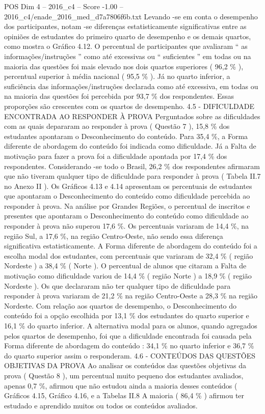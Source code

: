 \begin{textsample}{POS Dim 4 – 2016\_c4 – Score -1.00 – 2016\_c4/enade\_2016\_med\_d7a7806f6b.txt}
Levando -se em conta o desempenho dos participantes, notam -se diferenças estatisticamente significativas entre as opiniões de estudantes do primeiro quarto de desempenho e os demais quartos, como mostra o Gráfico 4.12.
O percentual de participantes que avaliaram “ as informações/instruções ” como até excessivas ou “ suficientes ” em todas ou na maioria das questões foi mais elevado nos dois quartos superiores ( 96,2 \% ), percentual superior à média nacional ( 95,5 \% ).
Já no quarto inferior, a suficiência das informações/instruções declarada como até excessiva, em todas ou na maioria das questões foi percebida por 93,7 \% dos respondentes.
Essas proporções são crescentes com os quartos de desempenho. 4.5 - DIFICULDADE ENCONTRADA AO RESPONDER À PROVA Perguntados sobre as dificuldades com as quais depararam ao responder à prova ( Questão 7 ), 15,8 \% dos estudantes apontaram o Desconhecimento do conteúdo.
Para 35,4 \%, a Forma diferente de abordagem do conteúdo foi indicada como dificuldade.
Já a Falta de motivação para fazer a prova foi a dificuldade apontada por 17,4 \% dos respondentes.
Considerando -se todo o Brasil, 26,2 \% dos respondentes afirmaram que não tiveram qualquer tipo de dificuldade para responder à prova ( Tabela II.7 no Anexo II ).
Os Gráficos 4.13 e 4.14 apresentam os percentuais de estudantes que apontaram o Desconhecimento do conteúdo como dificuldade percebida ao responder à prova.
Na análise por Grandes Regiões, o percentual de inscritos e presentes que apontaram o Desconhecimento do conteúdo como dificuldade ao responder à prova não superou 17,6 \%.
Os percentuais variaram de 14,4 \%, na região Sul, a 17,6 \%, na região Centro-Oeste, não sendo essa diferença significativa estatisticamente.
A Forma diferente de abordagem do conteúdo foi a escolha modal dos estudantes, com percentuais que variaram de 32,4 \% ( região Nordeste ) a 38,4 \% ( Norte ).
O percentual de alunos que citaram a Falta de motivação como dificuldade variou de 14,4 \% ( região Norte ) a 18,9 \% ( região Nordeste ).
Os que declararam não ter qualquer tipo de dificuldade para responder à prova variaram de 21,2 \% na região Centro-Oeste a 28,3 \% na região Nordeste.
Com relação aos quartos de desempenho, o Desconhecimento do conteúdo foi a opção escolhida por 13,1 \% dos estudantes do quarto superior e 16,1 \% do quarto inferior.
A alternativa modal para os alunos, quando agregados pelos quartos de desempenho, foi que a dificuldade encontrada foi causada pela Forma diferente de abordagem do conteúdo : 34,1 \% no quarto inferior e 36,7 \% do quarto superior assim o responderam. 4.6 - CONTEÚDOS DAS QUESTÕES OBJETIVAS DA PROVA Ao analisar os conteúdos das questões objetivas da prova ( Questão 8 ), um percentual muito pequeno dos estudantes avaliados, apenas 0,7 \%, afirmou que não estudou ainda a maioria desses conteúdos ( Gráficos 4.15, Gráfico 4.16, e a Tabelas II.8 A maioria ( 86,4 \% ) afirmou ter estudado e aprendido muitos ou todos os conteúdos avaliados.

\end{textsample}
